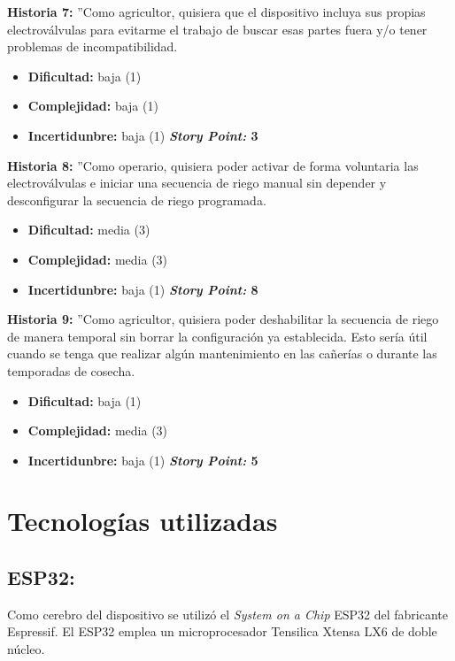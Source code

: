 \textbf{Historia 7:}
''Como agricultor, quisiera que el dispositivo incluya sus propias electroválvulas para evitarme el trabajo de buscar esas partes fuera y/o tener problemas de incompatibilidad.
\begin{itemize}
\item \textbf{Dificultad:} baja (1)
\item \textbf{Complejidad:} baja (1)
\item \textbf{Incertidunbre:} baja (1)
\newline
\newline
\textbf{\textit{Story Point:} 3}
\end{itemize}

\textbf{Historia 8:}
''Como operario, quisiera poder activar de forma voluntaria las electroválvulas e iniciar una secuencia de riego manual sin depender y desconfigurar la secuencia de riego programada.
\begin{itemize}
\item \textbf{Dificultad:} media (3)
\item \textbf{Complejidad:} media (3)
\item \textbf{Incertidunbre:} baja (1)
\newline
\newline
\textbf{\textit{Story Point:} 8}
\end{itemize}

\textbf{Historia 9:}
''Como agricultor, quisiera poder deshabilitar la secuencia de riego de manera temporal sin borrar la configuración ya establecida. Esto sería útil cuando se tenga que realizar algún mantenimiento en las cañerías o durante las temporadas de cosecha.
\begin{itemize}
\item \textbf{Dificultad:} baja (1) 
\item \textbf{Complejidad:} media (3) 
\item \textbf{Incertidunbre:} baja (1) 
\newline
\newline
\textbf{\textit{Story Point:} 5}
\end{itemize}

\section{Tecnologías utilizadas}
\subsection{ESP32:}
Como cerebro del dispositivo se utilizó el \textit{System on a Chip} ESP32 del fabricante Espressif. El ESP32 emplea un microprocesador Tensilica Xtensa LX6 de doble núcleo.

